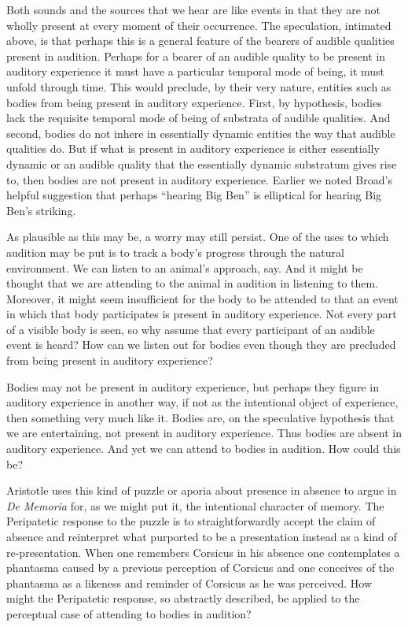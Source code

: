 \documentclass[12pt]{article}
\begin{document}
Both sounds and the sources that we hear are like events in that they are not wholly present at every moment of their occurrence. The speculation, intimated above, is that perhaps this is a general feature of the bearers of audible qualities present in audition. Perhaps for a bearer of an audible quality to be present in auditory experience it must have a particular temporal mode of being, it must unfold through time. This would preclude, by their very nature, entities such as bodies from being present in auditory experience. First, by hypothesis, bodies lack the requisite temporal mode of being of substrata of audible qualities. And second, bodies do not inhere in essentially dynamic entities the way that audible qualities do. But if what is present in auditory experience is either essentially dynamic or an audible quality that the essentially dynamic substratum gives rise to, then bodies are not present in auditory experience. Earlier we noted Broad’s helpful suggestion that perhaps “hearing Big Ben” is elliptical for hearing Big Ben’s striking.

As plausible as this may be, a worry may still persist. One of the uses to which audition may be put is to track a body’s progress through the natural environment. We can listen to an animal’s approach, say. And it might be thought that we are attending to the animal in audition in listening to them. Moreover, it might seem insufficient for the body to be attended to that an event in which that body participates is present in auditory experience. Not every part of a visible body is seen, so why assume that every participant of an audible event is heard? How can we listen out for bodies even though they are precluded from being present in auditory experience?

Bodies may not be present in auditory experience, but perhaps they figure in auditory experience in another way, if not as the intentional object of experience, then something very much like it. Bodies are, on the speculative hypothesis that we are entertaining, not present in auditory experience. Thus bodies are absent in auditory experience. And yet we can attend to bodies in audition. How could this be?

Aristotle uses this kind of puzzle or aporia about presence in absence to argue in \emph{De Memoria} for, as we might put it, the intentional character of memory. The Peripatetic response to the puzzle is to straightforwardly accept the claim of absence and reinterpret what purported to be a presentation instead as a kind of re-presentation. When one remembers Corsicus in his absence one contemplates a phantasma caused by a previous perception of Corsicus and one conceives of the phantasma as a likeness and reminder of Corsicus as he was perceived. How might the Peripatetic response, so abstractly described, be applied to the perceptual case of attending to bodies in audition?
\end{document}
